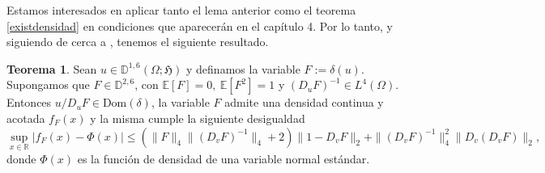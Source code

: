 \documentclass[letterpaper,twoside,12pt]{book}
\newcommand{\R}{\mathbb{R}}
\newcommand{\D}{\mathbb{D}}
\newcommand{\E}{\mathbb{E}}
\newcommand{\1}{\mathds{1}}
\newcommand{\abs}[1]{\left\lvert #1 \right\rvert}
\theoremstyle{definition}
\theoremstyle{definition}
\newtheorem{teo}{Teorema}
\theoremstyle{remark}
\theoremstyle{definition}
\theoremstyle{definition}
\theoremstyle{definition}
\theoremstyle{definition}
\theoremstyle{definition}
\begin{document}
Estamos interesados en aplicar tanto el lema anterior como el teorema \ref{existdensidad} en condiciones que aparecerán en el capítulo 4. Por lo tanto, y siguiendo de cerca a \cite[sección 3]{KUZGUN202268}, tenemos el siguiente resultado. 

\begin{teo}\label{teocotafundamental}
 Sean $u\in \D^{1,6}(\Omega;\mathcal{\mathfrak{H}})$ y definamos la variable $F:=\delta(u)$. Supongamos que $F\in \D^{2,6}$, con $\E\left[F\right]=0, \ \E\left[F^{2}\right]=1$ y $\left(D_uF\right)^{-1}\in L^4(\Omega)$. Entonces $u/D_uF \in \text{Dom}(\delta)$, la variable $F$ admite una densidad continua y acotada $f_F(x)$ y la misma cumple la siguiente desigualdad
 \begin{equation}\label{cotafundamental}
    \sup_{x\in \R} \abs{f_F(x)-\Phi(x)}\leq \left(\|F\|_4\|\left(D_vF\right)^{-1}\|_4+2\right)\|1-D_vF\|_2+\|\left(D_vF\right)^{-1}\|^{2}_4\|D_v \left(D_vF\right)\|_2,
 \end{equation}
donde $\Phi(x)$ es la función de densidad de una variable normal estándar.

\end{teo}
\end{document}
